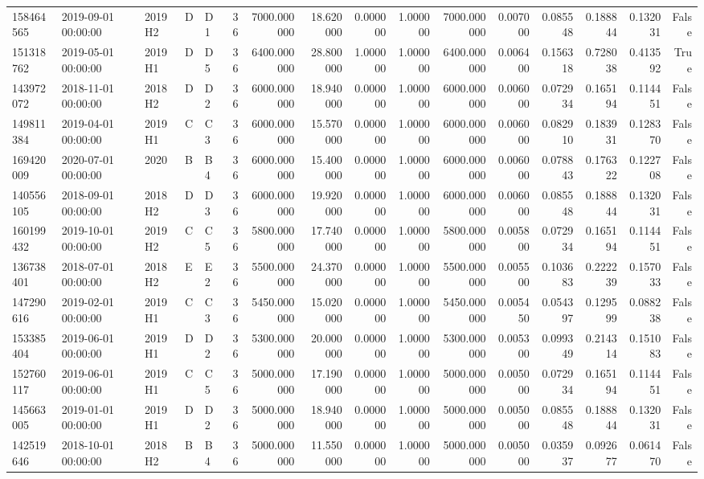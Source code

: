 \begin{tabular}{lllllrrrrrrrrrrr}
158464565 & 2019-09-01 00:00:00 & 2019H2 & D & D1 & 36 & 7000.000000 & 18.620000 & 0.000000 & 1.000000 & 7000.000000 & 0.007000 & 0.085548 & 0.188844 & 0.132031 & False \\
151318762 & 2019-05-01 00:00:00 & 2019H1 & D & D5 & 36 & 6400.000000 & 28.800000 & 1.000000 & 1.000000 & 6400.000000 & 0.006400 & 0.156318 & 0.728038 & 0.413592 & True \\
143972072 & 2018-11-01 00:00:00 & 2018H2 & D & D2 & 36 & 6000.000000 & 18.940000 & 0.000000 & 1.000000 & 6000.000000 & 0.006000 & 0.072934 & 0.165194 & 0.114451 & False \\
149811384 & 2019-04-01 00:00:00 & 2019H1 & C & C3 & 36 & 6000.000000 & 15.570000 & 0.000000 & 1.000000 & 6000.000000 & 0.006000 & 0.082910 & 0.183931 & 0.128370 & False \\
169420009 & 2020-07-01 00:00:00 & 2020 & B & B4 & 36 & 6000.000000 & 15.400000 & 0.000000 & 1.000000 & 6000.000000 & 0.006000 & 0.078843 & 0.176322 & 0.122708 & False \\
140556105 & 2018-09-01 00:00:00 & 2018H2 & D & D3 & 36 & 6000.000000 & 19.920000 & 0.000000 & 1.000000 & 6000.000000 & 0.006000 & 0.085548 & 0.188844 & 0.132031 & False \\
160199432 & 2019-10-01 00:00:00 & 2019H2 & C & C5 & 36 & 5800.000000 & 17.740000 & 0.000000 & 1.000000 & 5800.000000 & 0.005800 & 0.072934 & 0.165194 & 0.114451 & False \\
136738401 & 2018-07-01 00:00:00 & 2018H2 & E & E2 & 36 & 5500.000000 & 24.370000 & 0.000000 & 1.000000 & 5500.000000 & 0.005500 & 0.103683 & 0.222239 & 0.157033 & False \\
147290616 & 2019-02-01 00:00:00 & 2019H1 & C & C3 & 36 & 5450.000000 & 15.020000 & 0.000000 & 1.000000 & 5450.000000 & 0.005450 & 0.054397 & 0.129599 & 0.088238 & False \\
153385404 & 2019-06-01 00:00:00 & 2019H1 & D & D2 & 36 & 5300.000000 & 20.000000 & 0.000000 & 1.000000 & 5300.000000 & 0.005300 & 0.099349 & 0.214314 & 0.151083 & False \\
152760117 & 2019-06-01 00:00:00 & 2019H1 & C & C5 & 36 & 5000.000000 & 17.190000 & 0.000000 & 1.000000 & 5000.000000 & 0.005000 & 0.072934 & 0.165194 & 0.114451 & False \\
145663005 & 2019-01-01 00:00:00 & 2019H1 & D & D2 & 36 & 5000.000000 & 18.940000 & 0.000000 & 1.000000 & 5000.000000 & 0.005000 & 0.085548 & 0.188844 & 0.132031 & False \\
142519646 & 2018-10-01 00:00:00 & 2018H2 & B & B4 & 36 & 5000.000000 & 11.550000 & 0.000000 & 1.000000 & 5000.000000 & 0.005000 & 0.035937 & 0.092677 & 0.061470 & False \\

\end{tabular}
